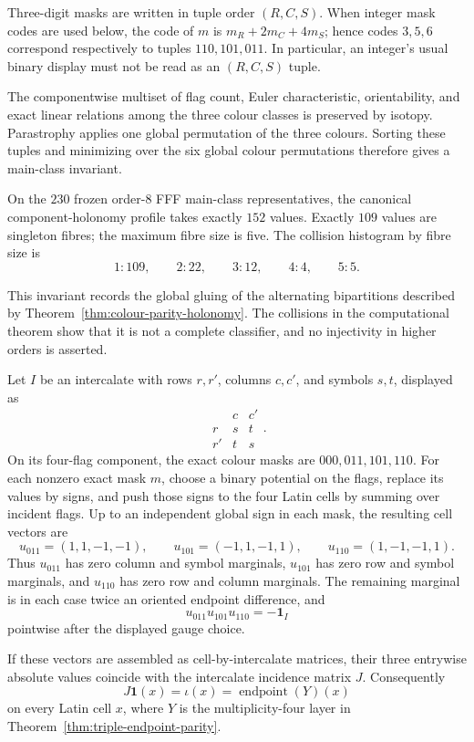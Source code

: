 Three-digit masks are written in tuple order $(R,C,S)$.  When integer mask
codes are used below, the code of $m$ is $m_R+2m_C+4m_S$; hence codes
$3,5,6$ correspond respectively to tuples $110,101,011$.  In particular,
an integer's usual binary display must not be read as an $(R,C,S)$ tuple.

The componentwise multiset of flag count, Euler characteristic,
orientability, and exact linear relations among the three colour classes is
preserved by isotopy.  Parastrophy applies one global permutation of the
three colours.  Sorting these tuples and minimizing over the six global
colour permutations therefore gives a main-class invariant.

\begin{computationaltheorem}
\label{cthm:holonomy-profile}
On the $230$ frozen order-$8$ FFF main-class representatives, the canonical
component-holonomy profile takes exactly $152$ values.  Exactly $109$ values
are singleton fibres; the maximum fibre size is five.  The collision
histogram by fibre size is
\[
 1:109,\qquad 2:22,\qquad 3:12,\qquad 4:4,\qquad 5:5.
\]
\end{computationaltheorem}

This invariant records the global gluing of the alternating bipartitions
described by Theorem~\ref{thm:colour-parity-holonomy}.  The collisions in the computational
theorem show that it is not a complete classifier, and no injectivity in
higher orders is asserted.

\begin{theorem}
\label{thm:holonomy-cell-lift}
Let $I$ be an intercalate with rows $r,r'$, columns $c,c'$, and symbols
$s,t$, displayed as
\[
 \begin{array}{c|cc}
      &c&c'\\ \hline
 r    &s&t\\
 r'   &t&s
 \end{array}.
\]
On its four-flag component, the exact colour masks are
$000,011,101,110$.  For each nonzero exact mask $m$, choose a binary
potential on the flags, replace its values by signs, and push those signs to
the four Latin cells by summing over incident flags.  Up to an independent
global sign in each mask, the resulting cell vectors are
\[
 u_{011}=(1,1,-1,-1),\qquad
 u_{101}=(-1,1,-1,1),\qquad
 u_{110}=(1,-1,-1,1).
\]
Thus $u_{011}$ has zero column and symbol marginals, $u_{101}$ has zero row and
symbol marginals, and $u_{110}$ has zero row and column marginals.  The
remaining marginal is in each case twice an oriented endpoint difference,
and
\[
 u_{011}u_{101}u_{110}=-\mathbf 1_I
\]
pointwise after the displayed gauge choice.

If these vectors are assembled as cell-by-intercalate matrices, their three
entrywise absolute values coincide with the intercalate incidence matrix
$J$.  Consequently
\[
 J\mathbf 1(x)=\iota(x)
 =\operatorname{endpoint}(Y)(x)
\]
on every Latin cell $x$, where $Y$ is the multiplicity-four layer in
Theorem~\ref{thm:triple-endpoint-parity}.
\end{theorem}

